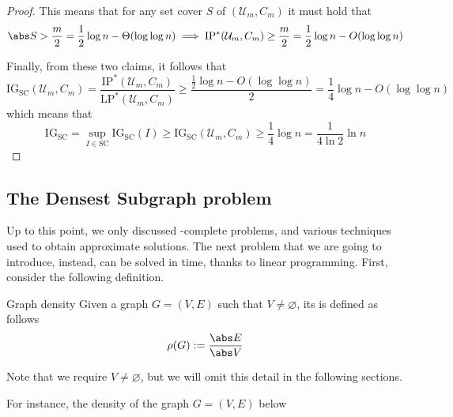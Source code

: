 \documentclass[a4paper, 12pt]{report}
\begin{document}
\begin{proof}
{            This means that for any set cover $S$ of $(\mathcal U_m, C_m)$ it must hold that $$\abs S > \dfrac{m}{2} = \dfrac{1}{2} \log n - \Theta(\log \log n) \implies \mathrm{IP^*}(\mathcal U_m, C_m) \ge \dfrac{m}{2} = \dfrac{1}{2} \log n - O(\log \log n)$$
        }

        Finally, from these two claims, it follows that $$\mathrm{IG_{SC}}(\mathcal U_m, C_m) = \dfrac{\mathrm{IP^*}(\mathcal U_m, C_m)}{\mathrm{LP^*}(\mathcal U_m, C_m)} \ge \dfrac{\tfrac{1}{2} \log n - O(\log \log n)}{2} = \dfrac{1}{4} \log n - O(\log \log n)$$ which means that $$\mathrm{IG_{SC}} = \sup_{I \in \mathrm{SC}}{\mathrm{IG_{SC}}(I)} \ge \mathrm{IG_{SC}}(\mathcal U_m, C_m) \ge \dfrac{1}{4} \log n = \dfrac{1}{4 \ln 2} \ln n$$
    \end{proof}

    \subsection{The Densest Subgraph problem}
    
    Up to this point, we only discussed \NPclass-complete problems, and various techniques used to obtain approximate solutions. The next problem that we are going to introduce, instead, can be solved in  time, thanks to linear programming. First, consider the following definition.

    \begin{frameddefn}{Graph density}
        Given a graph $G = (V, E)$ such that $V \neq \varnothing$, its  is defined as follows $$\rho(G) := \dfrac{\abs E}{\abs V}$$
    \end{frameddefn}

    Note that we require $V \neq \varnothing$, but we will omit this detail in the following sections.

    For instance, the density of the graph $G = (V, E)$ below

    \begin{figure}[H]
        \centering
    \end{figure}
\end{document}
